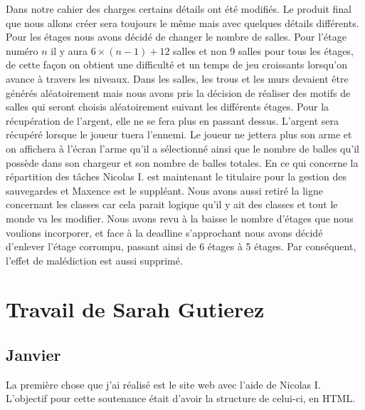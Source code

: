 \documentclass[]{extarticle}
\begin{document}
\begin{spacing}{1.25}
\bigbreak
\bigbreak
Dans notre cahier des charges certains détails ont été modifiés. Le produit final que nous allons créer sera toujours le même mais avec quelques détails différents. Pour les étages nous avons décidé de changer le nombre de salles. Pour l’étage numéro $n$ il y aura $6 \times (n - 1) + 12$ salles et non 9 salles pour tous les étages, de cette façon on obtient une difficulté et un temps de jeu croissants lorsqu'on avance à travers les niveaux.
\bigbreak
Dans les salles, les trous et les murs devaient être générés aléatoirement mais nous avons pris la décision de réaliser des motifs de salles qui seront choisis aléatoirement suivant les différents étages. 
\bigbreak
Pour la récupération de l’argent, elle ne se fera plus en passant dessus. L’argent sera récupéré lorsque le joueur tuera l’ennemi. 
\bigbreak
Le joueur ne jettera plus son arme et on affichera à l’écran l’arme qu'il a sélectionné ainsi que le nombre de balles qu'il possède dans son chargeur et son nombre de balles totales. 
\bigbreak
En ce qui concerne la répartition des tâches Nicolas I. est maintenant le titulaire pour la gestion des sauvegardes et Maxence est le suppléant. Nous avons aussi retiré la ligne concernant les classes car cela parait logique qu’il y ait des classes et tout le monde va les modifier.
\bigbreak
Nous avons revu à la baisse le nombre d'étages que nous voulions incorporer, et face à la deadline s'approchant nous avons décidé d'enlever l'étage corrompu, passant ainsi de 6 étages à 5 étages.
\bigbreak
Par conséquent, l'effet de malédiction est aussi supprimé.
\newpage

\section{Travail de Sarah Gutierez}

\subsection{Janvier}
\bigbreak
\bigbreak
La première chose que j’ai réalisé est le site web avec l’aide de Nicolas I. L’objectif pour cette soutenance était d’avoir la structure de celui-ci, en HTML. 


\end{spacing}
\end{document}
